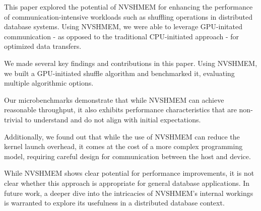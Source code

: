 This paper explored the potential of NVSHMEM for enhancing the performance of communication-intensive workloads such as shuffling operations in distributed database systems.
Using NVSHMEM, we were able to leverage GPU-initated communication - as opposed to the traditional CPU-initiated approach - for optimized data transfers.

We made several key findings and contributions in this paper.
Using NVSHMEM, we built a GPU-initiated shuffle algorithm and benchmarked it, evaluating multiple algorithmic options.

Our microbenchmarks demonstrate that while NVSHMEM can achieve reasonable throughput, it also exhibits performance characteristics that are non-trivial to understand and do not align with initial expectations.

Additionally, we found out that while the use of NVSHMEM can reduce the kernel launch overhead, it comes at the cost of a more complex programming model, requiring careful design for communication between the host and device.

While NVSHMEM shows clear potential for performance improvements, it is not clear whether this approach is appropriate for general database applications.
In future work, a deeper dive into the intricacies of NVSHMEM's internal workings is warranted to explore its usefulness in a distributed database context.


